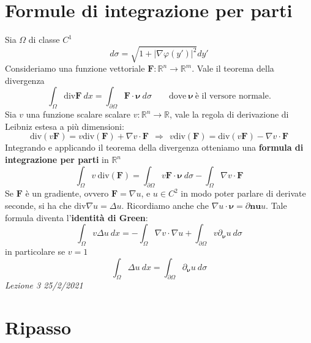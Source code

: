 \documentclass[10pt,a4paper,twoside,openright]{book}
\begin{document}
\section{Formule di integrazione per parti}

Sia $\Omega $ di classe $C^{1}$
\begin{equation*}
d\sigma =\sqrt{1+| \nabla \varphi (y')| ^{2}} dy'
\end{equation*}
Consideriamo una funzione vettoriale $\mathbf{F}:\mathbb{R}^{n}\to\mathbb{R}^{m}$. Vale il teorema della divergenza
\begin{equation*}
\int _{\Omega }\mathrm{div}\mathbf{F}\ dx=\int _{\partial \Omega }\mathbf{F} \cdotp \bm{\nu}\ d\sigma \qquad \text{dove}\ \bm{\nu}\ \text{è il versore normale.}
\end{equation*}
Sia $v$ una funzione scalare scalare $v:\mathbb{R}^{n}\to \mathbb{R}$, vale la regola di derivazione di Leibniz estesa a più dimensioni:
\begin{equation*}
\mathrm{div}(v\mathbf{F}) =v\mathrm{div}(\mathbf{F}) +\nabla v\cdotp \mathbf{F} \ \ \Rightarrow \ \ v\mathrm{div}(\mathbf{F}) =\mathrm{div}(v\mathbf{F}) -\nabla v\cdotp \mathbf{F}
\end{equation*}
Integrando e applicando il teorema della divergenza otteniamo una \textbf{formula di integrazione per parti} in $\mathbb{R}^{n}$
\begin{equation}
\boxed{\int _{\Omega } v\ \mathrm{div}(\mathbf{F}) =\int _{\partial \Omega } v\mathbf{F} \cdotp \bm{\nu} \ d\sigma -\int _{\Omega } \nabla v\cdotp \mathbf{F}}
\end{equation}
Se $\mathbf{F}$ è un gradiente, ovvero $\mathbf{F} =\nabla u$, e $u\in C^{2}$ in modo poter parlare di derivate seconde, si ha che $\mathrm{div} \nabla u=\Delta u$. Ricordiamo anche che $\nabla u\cdot\bm{\nu} = \partial\bm{nu}u$. Tale formula diventa l'\textbf{identità di Green}:
\begin{equation}
\boxed{\int _{\Omega } v\Delta u\ dx=-\int _{\Omega } \nabla v\cdotp \nabla u+\int _{\partial \Omega } v\partial _{\bm{\nu}} u\ d\sigma }
\label{eq:id-green}
\end{equation}
in particolare se $v=1$
\begin{equation}
\int _{\Omega } \Delta u\ dx=\int _{\partial \Omega } \partial _{\bm{\nu}} u\ d\sigma 
\label{eq:id-green-v1}
\end{equation}
\textit{Lezione 3 25/2/2021}
\section{Ripasso}
\end{document}
